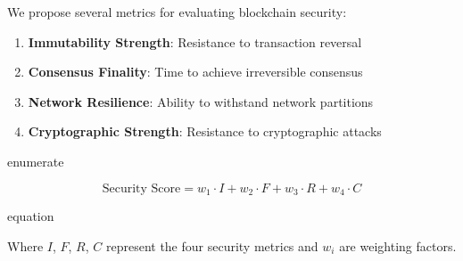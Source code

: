 We propose several metrics for evaluating blockchain security:

\begin{enumerate}
\item \textbf{Immutability Strength}: Resistance to transaction reversal
\item \textbf{Consensus Finality}: Time to achieve irreversible consensus
\item \textbf{Network Resilience}: Ability to withstand network partitions
\item \textbf{Cryptographic Strength}: Resistance to cryptographic attacks
\end{enumerate}

enumerate

\begin{equation}
\text{Security Score} = w_1 \cdot I + w_2 \cdot F + w_3 \cdot R + w_4 \cdot C
\end{equation}

equation

Where $I$, $F$, $R$, $C$ represent the four security metrics and $w_i$ are weighting factors.